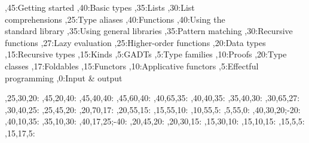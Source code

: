 
\setcounter{diagheight}{50}
\begin{chart}
	,45:{Getting started}
	,40:{Basic types}
	,35:{Lists}
	,30:{List\\comprehensions}
	,25:{Type aliases}
	,40:{Functions}
	,40:{Using the\\standard library}
	,35:{Using general libraries}
	,35:{Pattern matching}
	,30:{Recursive functions}
	,27:{Lazy evaluation}
	,25:{Higher-order functions}
	,20:{Data types}
	,15:{Recursive types}
	,15:{Kinds}
	,5:{GADTs}
	,5:{Type families}
	,10:{Proofs}
	,20:{Type classes}
	,17:{Foldables}
	,15:{Functors}
	,10:{Applicative functors}
	,5:{Effectful programming}
	,0:{Input \& output}
	
	,25,30,20:
	,45,20,40:
	,45,40,40:
	,45,60,40:
	,40,65,35:
	,40,40,35:
	,35,40,30:
	,30,65,27:
	,30,40,25:
	,25,45,20:
	,20,70,17:
	,20,55,15:
	,15,55,10:
	,10,55,5:
	,5,55,0:
	,40,30,20;-20:
	,40,10,35:
	,35,10,30:
	,40,17,25;-40:
	,20,45,20:
	,20,30,15:
	,15,30,10:
	,15,10,15:
	,15,5,5:
	,15,17,5:
\end{chart}

